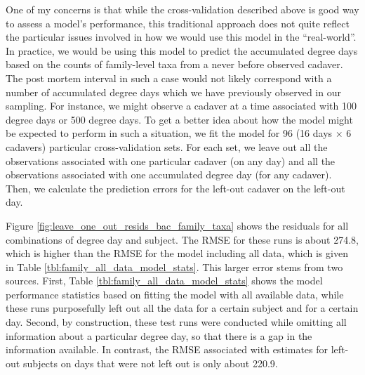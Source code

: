 \documentclass{article}
\begin{document}
One of my concerns is that while the cross-validation described above
is good way to assess a model's performance, this traditional approach
does not quite reflect the particular issues involved in how we would
use this model in the ``real-world''.  In practice, we would be using
this model to predict the accumulated degree days based on the counts
of family-level taxa from a never before observed cadaver.  The post
mortem interval in such a case would not likely correspond with a
number of accumulated degree days which we have previously observed in
our sampling.  For instance, we might observe a cadaver at a time
associated with 100 degree days or 500 degree days.  To get a better
idea about how the model might be expected to perform in such a
situation, we fit the model for 96 (16 days $\times$ 6 cadavers)
particular cross-validation sets.  For each set, we leave out all the
observations associated with one particular cadaver (on any day) and
all the observations associated with one accumulated degree day (for
any cadaver).  Then, we calculate the prediction errors for the
left-out cadaver on the left-out day.

Figure \ref{fig:leave_one_out_resids_bac_family_taxa} shows the
residuals for all combinations of degree day and subject.  The RMSE
for these runs is about 274.8, which is higher than the RMSE for the
model including all data, which is given in Table
\ref{tbl:family_all_data_model_stats}.  This larger error stems from
two sources.  First, Table \ref{tbl:family_all_data_model_stats} shows
the model performance statistics based on fitting the model with all
available data, while these runs purposefully left out all the data
for a certain subject and for a certain day.  Second, by construction,
these test runs were conducted while omitting all information about a
particular degree day, so that there is a gap in the information
available.  In contrast, the RMSE associated with estimates for
left-out subjects on days that were not left out is only about 220.9.
\end{document}
